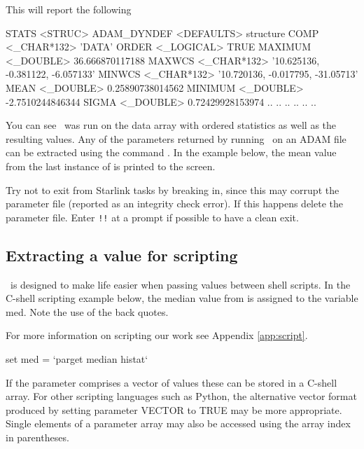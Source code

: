 \documentclass[11pt,oneside,chapters]{starlink}
\begin{document}
This will report the following
\begin{terminalv}
STATS  <STRUC>
   ADAM_DYNDEF    <DEFAULTS>      {structure}
   COMP           <_CHAR*132>     'DATA'
   ORDER          <_LOGICAL>      TRUE
   MAXIMUM        <_DOUBLE>       36.666870117188
   MAXWCS         <_CHAR*132>     '10.625136, -0.381122, -6.057133'
   MINWCS         <_CHAR*132>     '10.720136, -0.017795, -31.05713'
   MEAN           <_DOUBLE>       0.25890738014562
   MINIMUM        <_DOUBLE>       -2.7510244846344
   SIGMA          <_DOUBLE>       0.72429928153974
    ..               ..                 ..
    ..               ..                 ..
\end{terminalv}
\vspace{0.3cm}
You can see \stats\ was run on the data array with ordered statistics
as well as the resulting values. Any of the parameters returned by
running \HDSTRACE\ on an ADAM file can be extracted using the command
. In the example below, the mean value from the last
instance of  is printed to the screen.
\begin{terminalv}
\end{terminalv}

\begin{tip}
Try not to exit from Starlink tasks by breaking in, since this may
corrupt the parameter file (reported as an integrity check error).  If
this happens delete the parameter file.  Enter \texttt{!!} at a prompt
if possible to have a clean exit.
\end{tip}

\subsection{Extracting a value for scripting}

\parget\ is designed to make life easier when passing values between
shell scripts. In the C-shell scripting example below, the median
value from  is assigned to the variable med.  Note the
use of the back quotes.

For more information on scripting our work see Appendix \ref{app:script}.

\begin{terminalv}
set med = `parget median histat`
\end{terminalv}

If the parameter comprises a vector of values these can be stored in a
C-shell array. For other scripting languages such as Python, the
alternative vector format produced by setting parameter VECTOR to TRUE
may be more appropriate. Single elements of a parameter array may also
be accessed using the array index in parentheses.
\end{document}
